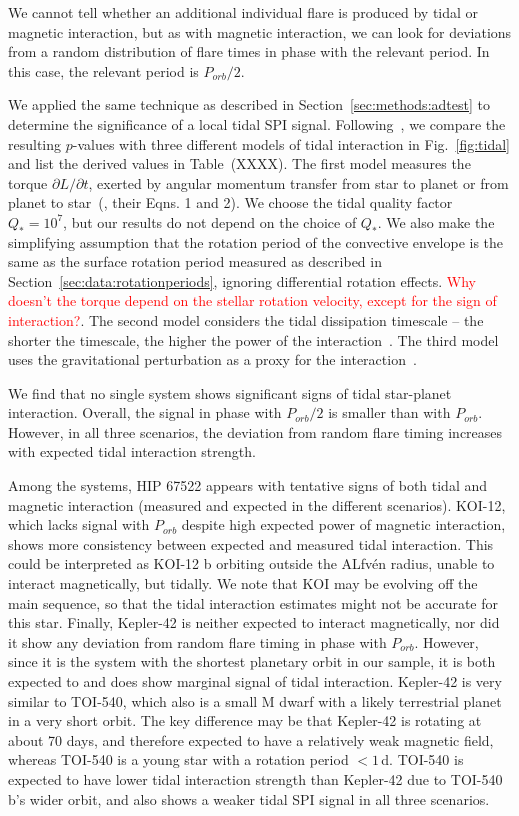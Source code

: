 \documentclass[twocolumn]{aastex631}
\begin{document}
We cannot tell whether an additional individual flare is produced by tidal or magnetic interaction, but as with magnetic interaction, we can look for deviations from a random distribution of flare times in phase with the relevant period. In this case, the relevant period is $P_{orb}/2$.

We applied the same technique as described in Section~\ref{sec:methods:adtest} to determine the significance of a local tidal SPI signal. Following~\citet{ilic2022tidal}, we compare the resulting $p$-values with three different models of tidal interaction in Fig.~\ref{fig:tidal} and list the derived values in Table~(XXXX). The first model measures the torque $\partial L / \partial t$, exerted by angular momentum transfer from star to planet or from planet to star~(\citealt{penev2012constraining}, their Eqns. 1 and 2). We choose the tidal quality factor $Q_*=10^7$, but our results do not depend on the choice of $Q_*$. We also make the simplifying assumption that the rotation period of the convective envelope is the same as the surface rotation period measured as described in Section~\ref{sec:data:rotationperiods}, ignoring differential rotation effects. \textcolor{red}{Why doesn't the torque depend on the stellar rotation velocity, except for the sign of interaction?}. The second model considers the tidal dissipation timescale -- the shorter the timescale, the higher the power of the interaction~\citep{albrecht2012obliquities}. The third model uses the gravitational perturbation as a proxy for the interaction~\citep{cuntz2000stellar}.


We find that no single system shows significant signs of tidal star-planet interaction. Overall, the signal in phase with $P_{orb}/2$ is smaller than with $P_{orb}$. However, in all three scenarios, the deviation from random flare timing increases with expected tidal interaction strength. 

Among the systems, HIP 67522 appears with tentative signs of both tidal and magnetic interaction (measured and expected in the different scenarios). KOI-12, which lacks signal with $P_{orb}$ despite high expected power of magnetic interaction, shows more consistency between expected and measured tidal interaction. This could be interpreted as KOI-12 b orbiting outside the ALfv\'en radius, unable to interact magnetically, but tidally. We note that KOI may be evolving off the main sequence, so that the tidal interaction estimates might not be accurate for this star. Finally, Kepler-42 is neither expected to interact magnetically, nor did it show any deviation from random flare timing in phase with $P_{orb}$. However, since it is the system with the shortest planetary orbit in our sample, it is both expected to and does show marginal signal of tidal interaction. Kepler-42 is very similar to TOI-540, which also is a small M dwarf with a likely terrestrial planet in a very short orbit. The key difference may be that Kepler-42 is rotating at about 70 days, and therefore expected to have a relatively weak magnetic field, whereas TOI-540 is a young star with a rotation period $<1\,$d. TOI-540 is expected to have lower tidal interaction strength than Kepler-42 due to TOI-540 b's wider orbit, and also shows a weaker tidal SPI signal in all three scenarios. 
\end{document}
